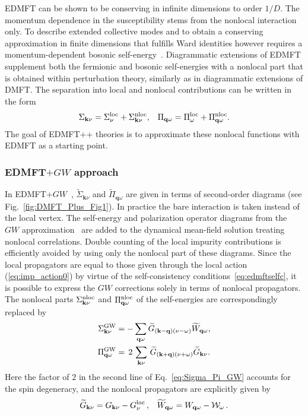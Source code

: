 \documentclass[rmp,aps,reprint,amsmath,amssymb,superscriptaddress,showpacs,nofootinbib]{revtex4-1}
\newcommand{\kv}{\ensuremath{\mathbf{k}}}
\newcommand{\qv}{\ensuremath{\mathbf{q}}}
\begin{document}
EDMFT can be shown to be conserving in infinite dimensions to order $1/D$. The momentum dependence in the susceptibility stems from the nonlocal interaction only. To describe extended collective modes and to obtain a conserving approximation in finite dimensions that fulfills Ward identities however requires a momentum-dependent bosonic self-energy~\cite{Hafermann2014a}. Diagrammatic extensions of EDMFT supplement both the fermionic and bosonic self-energies with a nonlocal part that is obtained within perturbation theory, similarly as in diagrammatic extensions of DMFT. The separation into local and nonlocal contributions can be written in the form
\begin{eqnarray}
\label{Eq:SigmaPiNonloc}
  \Sigma _{\mathbf{k}\nu}=\Sigma ^{\mathrm{loc}}_\nu +{\Sigma }^{\rm nloc}_{\mathbf{k}\nu} , \;\;\;
  \Pi _{\mathbf{q}\omega}=\Pi ^{\mathrm{loc}}_\omega +{\Pi }^{\rm nloc}_{\mathbf{q}\omega}.
\end{eqnarray}
The goal of EDMFT++ theories is to approximate these nonlocal functions with EDMFT as a starting point. 

\subsubsection{EDMFT\texorpdfstring{$+GW$}{+GW} approach}
\label{sec:edmftGW}
 
In EDMFT$+GW$~\cite{Sun02,Biermann2003,Tomczak2012,Ayral2012,Ayral2013,Hansmann2013,Tomczak2014,Huang14,Boehnke2016}, $\widetilde{\Sigma}_{\kv\nu}$ and $\widetilde{\Pi}_{\qv\omega}$ are given in terms of second-order diagrams (see Fig.~\ref{fig:DMFT_Plus_Fig1}). In practice the bare interaction is taken instead of the local vertex. The self-energy and polarization operator diagrams from the $GW$ approximation~\cite{Hedin1965,Aryasetiawan1998,Hedin1999} are added to the dynamical mean-field solution treating nonlocal correlations. Double counting of the local impurity contributions is efficiently avoided by using only the nonlocal part of these diagrams. Since the local propagators are equal to those given through the local action (\ref{eq:imp_action0}) by virtue of the self-consistency conditions~\eqref{eq:edmftselfc}, it is possible to express the $GW$ corrections solely in terms of nonlocal propagators. The nonlocal parts ${\Sigma }^{\rm nloc}_{\kv\nu}$ and ${\Pi }^{\rm nloc}_{\qv\omega}$ of the self-energies are correspondingly replaced by
\begin{align}
\label{eq:Sigma_Pi_GW}
  {\Sigma}^{\rm GW}_{\kv\nu} &=-\sum\limits_{\qv\omega}\widetilde{G}_{(\kv-\qv)(\nu-\omega)}\widetilde{W}_{\qv\omega},\notag\\
  {\Pi}^{\rm GW}_{\qv\omega} &= \,2\,\sum\limits_{\kv\nu}\,\widetilde{G}_{(\kv+\qv)(\nu+\omega)}\widetilde{G}_{\kv\nu}.
\end{align}
Here the factor of $2$ in the second line of Eq.~\eqref{eq:Sigma_Pi_GW} accounts for the spin degeneracy, and  the  nonlocal propagators are explicitly given by
\begin{align}
\label{eq:WEMDFTGW}
  \widetilde{G}_{\kv\nu} = G_{\kv\nu} -G^{\text{loc}}_\nu\,, &&
  \widetilde{W}_{\qv\omega} = W_{\qv\omega} - {\cal W}_{\omega}\,.
\end{align}
\end{document}
